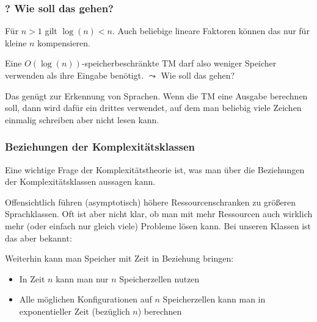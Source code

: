 \documentclass[aspectratio=1610,onlymath]{beamer}
\begin{document}
\begin{frame}\frametitle{? Wie soll das gehen?}

Für $n>1$ gilt \alert{$\log(n)<n$}. Auch beliebige lineare Faktoren können das nur für kleine $n$ kompensieren.\\
\medskip

Eine $O(\log(n))$-speicherbeschränkte TM darf also weniger Speicher verwenden als ihre Eingabe benötigt.
\alert{$\leadsto$ Wie soll das gehen?}
\bigskip\pause


{\footnotesize
Das genügt zur Erkennung von Sprachen. Wenn die TM eine Ausgabe berechnen soll, dann wird dafür ein 
drittes  verwendet, auf dem man beliebig viele Zeichen einmalig schreiben aber nicht lesen kann.\\
}

\end{frame}

\begin{frame}\frametitle{Beziehungen der Komplexitätsklassen}

\alert{Eine wichtige Frage der Komplexitätstheorie ist, was man über die Beziehungen der
Komplexitätsklassen aussagen kann.}
\medskip\pause

Offensichtlich führen (asymptotisch) höhere Ressourcenschranken zu größeren Sprachklassen.
Oft ist aber nicht klar, ob man mit mehr Ressourcen auch wirklich mehr (oder einfach nur gleich viele) Probleme lösen kann. Bei
unseren Klassen ist das aber bekannt:\medskip

\medskip\pause

Weiterhin kann man Speicher mit Zeit in Beziehung bringen:
\begin{itemize}
\item In Zeit $n$ kann man nur $n$ Speicherzellen nutzen
\item Alle möglichen Konfigurationen auf $n$ Speicherzellen kann man in exponentieller Zeit (bezüglich $n$) berechnen
\end{itemize}


\end{frame}
\end{document}

